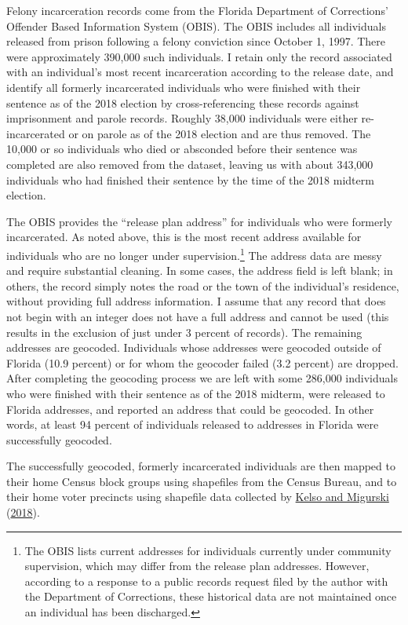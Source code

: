 \documentclass[
  12pt,
]{article}
\begin{document}
Felony incarceration records come from the Florida Department of Corrections' Offender Based Information System (OBIS). The OBIS includes all individuals released from prison following a felony conviction since October 1, 1997. There were approximately 390,000 such individuals. I retain only the record associated with an individual's most recent incarceration according to the release date, and identify all formerly incarcerated individuals who were finished with their sentence as of the 2018 election by cross-referencing these records against imprisonment and parole records. Roughly 38,000 individuals were either re-incarcerated or on parole as of the 2018 election and are thus removed. The 10,000 or so individuals who died or absconded before their sentence was completed are also removed from the dataset, leaving us with about 343,000 individuals who had finished their sentence by the time of the 2018 midterm election.

The OBIS provides the ``release plan address'' for individuals who were formerly incarcerated. As noted above, this is the most recent address available for individuals who are no longer under supervision.\footnote{The OBIS lists current addresses for individuals currently under community supervision, which may differ from the release plan addresses. However, according to a response to a public records request filed by the author with the Department of Corrections, these historical data are not maintained once an individual has been discharged.} The address data are messy and require substantial cleaning. In some cases, the address field is left blank; in others, the record simply notes the road or the town of the individual's residence, without providing full address information. I assume that any record that does not begin with an integer does not have a full address and cannot be used (this results in the exclusion of just under 3 percent of records). The remaining addresses are geocoded. Individuals whose addresses were geocoded outside of Florida (10.9 percent) or for whom the geocoder failed (3.2 percent) are dropped. After completing the geocoding process we are left with some 286,000 individuals who were finished with their sentence as of the 2018 midterm, were released to Florida addresses, and reported an address that could be geocoded. In other words, at least 94 percent of individuals released to addresses in Florida were successfully geocoded.

The successfully geocoded, formerly incarcerated individuals are then mapped to their home Census block groups using shapefiles from the Census Bureau, and to their home voter precincts using shapefile data collected by \protect\hyperlink{ref-Kelso2018}{Kelso and Migurski} (\protect\hyperlink{ref-Kelso2018}{2018}).
\end{document}
